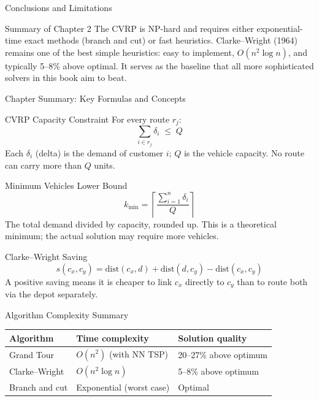 \documentclass[aspectratio=169,10pt]{beamer}
\begin{document}
\begin{frame}[allowframebreaks]{Conclusions and Limitations}
  \begin{alertblock}{Summary of Chapter 2}
    The CVRP is NP-hard and requires either exponential-time exact methods
    (branch and cut) or fast heuristics.  Clarke--Wright (1964) remains one
    of the best simple heuristics: easy to implement, $O(n^2 \log n)$,
    and typically 5--8\% above optimal.  It serves as the baseline that
    all more sophisticated solvers in this book aim to beat.
  \end{alertblock}

\end{frame}

\begin{frame}[allowframebreaks]{Chapter Summary: Key Formulas and Concepts}

  \begin{block}{CVRP Capacity Constraint}
    For every route $r_j$:
    \[
      \sum_{i \in r_j} \delta_i \;\leq\; Q
    \]
    Each $\delta_i$ (delta) is the demand of customer $i$; $Q$ is the vehicle
    capacity.  No route can carry more than $Q$ units.
  \end{block}

  \begin{block}{Minimum Vehicles Lower Bound}
    \[
      k_{\min} = \left\lceil \frac{\sum_{i=1}^{n} \delta_i}{Q} \right\rceil
    \]
    The total demand divided by capacity, rounded up.  This is a theoretical
    minimum; the actual solution may require more vehicles.
  \end{block}

  \begin{block}{Clarke--Wright Saving}
    \[
      s(c_x, c_y) = \mathrm{dist}(c_x, d) + \mathrm{dist}(d, c_y) - \mathrm{dist}(c_x, c_y)
    \]
    A positive saving means it is cheaper to link $c_x$ directly to $c_y$
    than to route both via the depot separately.
  \end{block}

  \framebreak

  \begin{block}{Algorithm Complexity Summary}
    \begin{center}
      \begin{tabular}{lll}
        \toprule
        Algorithm & Time complexity & Solution quality \\
        \midrule
        Grand Tour    & $O(n^2)$ (with NN TSP)   & 20--27\% above optimum \\
        Clarke--Wright & $O(n^2 \log n)$          & 5--8\% above optimum \\
        Branch and cut & Exponential (worst case) & Optimal \\
        \bottomrule
      \end{tabular}
    \end{center}
  \end{block}


\end{frame}
\end{document}
